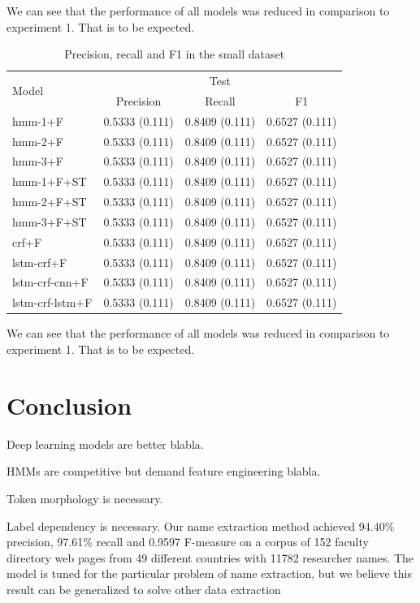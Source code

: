 \documentclass[sigconf]{acmart}
\begin{document}
We can see that the performance of all models was reduced in comparison 
to experiment 1. That is to be expected.

\begin{table}[h]
  \small
  \begin{center}
    \begin{tabular}{ |l|l|l|l|}
      \hline
      \multirow{2}{*}{Model} & \multicolumn{3}{c|}{Test} \\
                             & \multicolumn{1}{c}{Precision} & \multicolumn{1}{c}{Recall} & \multicolumn{1}{c|}{F1} \\
      \hline
      hmm-1+F         & 0.5333 (0.111) & 0.8409 (0.111) & 0.6527 (0.111) \\
      hmm-2+F         & 0.5333 (0.111) & 0.8409 (0.111) & 0.6527 (0.111) \\
      hmm-3+F         & 0.5333 (0.111) & 0.8409 (0.111) & 0.6527 (0.111) \\
      hmm-1+F+ST        & 0.5333 (0.111) & 0.8409 (0.111) & 0.6527 (0.111) \\
      hmm-2+F+ST        & 0.5333 (0.111) & 0.8409 (0.111) & 0.6527 (0.111) \\
      hmm-3+F+ST        & 0.5333 (0.111) & 0.8409 (0.111) & 0.6527 (0.111) \\
      crf+F           & 0.5333 (0.111) & 0.8409 (0.111) & 0.6527 (0.111) \\
      lstm-crf+F      & 0.5333 (0.111) & 0.8409 (0.111) & 0.6527 (0.111) \\
      lstm-crf-cnn+F  & 0.5333 (0.111) & 0.8409 (0.111) & 0.6527 (0.111) \\
      lstm-crf-lstm+F & 0.5333 (0.111) & 0.8409 (0.111) & 0.6527 (0.111) \\
      \hline
    \end{tabular}
  \end{center}
  \caption{Precision, recall and F1 in the small dataset}
  \label{tab:experiment2f}
\end{table}

We can see that the performance of all models was reduced in comparison 
to experiment 1. That is to be expected.

\section{Conclusion}

Deep learning models are better blabla.

HMMs are competitive but demand feature engineering blabla.

Token morphology is necessary.

Label dependency is necessary.
Our name extraction method achieved 94.40\% precision, 97.61\% recall 
and 0.9597 F-measure on a corpus of 152 faculty directory web pages from
49 different countries with 11782 researcher names. 
The model is tuned for the particular problem of name extraction, 
but we believe this result can be generalized to solve other data extraction 
\end{document}
